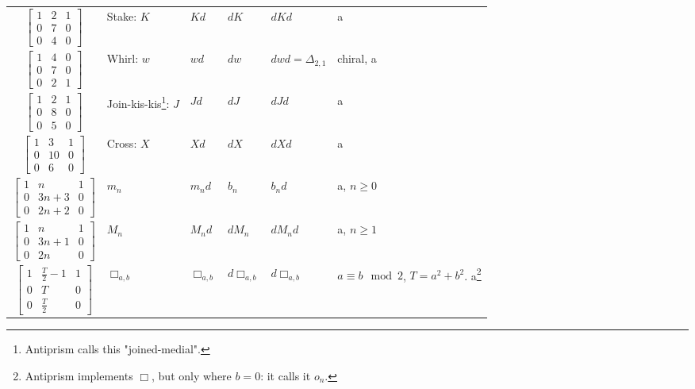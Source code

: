 \documentclass{amsart}[12pt]
\begin{document}
\begin{longtable}{c|p{2cm}|p{2cm}|p{2cm}|p{2cm}|p{3cm}}
    \\
    $\begin{bmatrix}
    1 & 2 & 1 \\
    0 & 7 & 0 \\
    0 & 4 & 0 \end{bmatrix}$& Stake: $K$ & $Kd$ & $dK$ & $dKd$ & a
    \\
    $\begin{bmatrix}
    1 & 4 & 0 \\
    0 & 7 & 0 \\
    0 & 2 & 1 \end{bmatrix}$& Whirl: $w$ & $wd$ & $dw$ & $dwd=\Delta_{2,1}$ & chiral, a
    \\
    $\begin{bmatrix}
    1 & 2 & 1 \\
    0 & 8 & 0 \\
    0 & 5 & 0 \end{bmatrix}$& Join-kis-kis\footnote{Antiprism calls this "joined-medial".}: $J$ & $Jd$ & $dJ$ & $dJd$ & a
    \\
    $\begin{bmatrix}
    1 & 3 & 1 \\
    0 & 10 & 0 \\
    0 & 6 & 0 \end{bmatrix}$& Cross: $X$ & $Xd$ & $dX$ & $dXd$ & a
    \\
    $\begin{bmatrix}
    1 & n & 1 \\
    0 & 3n+3 & 0 \\
    0 & 2n+2 & 0 \end{bmatrix}$& $m_n$ & $m_n d$ & $b_n$ & $b_n d$ & a, $n \ge 0$
    \\
    $\begin{bmatrix}
    1 & n & 1 \\
    0 & 3n+1 & 0 \\
    0 & 2n & 0 \end{bmatrix}$& $M_n$ & $M_n d$ & $dM_n$ & $dM_n d$ & a, $n \ge 1$
    \\
    $\begin{bmatrix}
    1 & \frac{T}{2} - 1 & 1 \\
    0 & T & 0 \\
    0 & \frac{T}{2} & 0 \end{bmatrix}$& $\Box_{a,b}$ & $\Box_{a,b}$ & $d\Box_{a,b}$ & $d\Box_{a,b}$ & $a \equiv b \mod 2$, $T=a^2+b^2$. a\footnote{Antiprism implements $\Box$, but only where $b=0$: it calls it $o_n$.}
    \\

\end{longtable}
\end{document}
